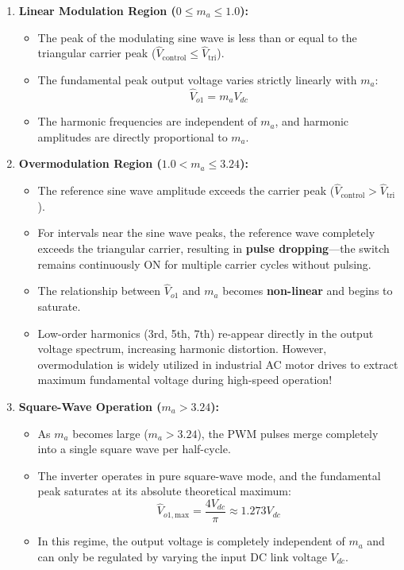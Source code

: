 \documentclass[11pt,a4paper]{article}
\begin{document}
\begin{enumerate}[leftmargin=*]
  \item \textbf{Linear Modulation Region ($0 \le m_a \le 1.0$):}
  \begin{itemize}
    \item The peak of the modulating sine wave is less than or equal to the triangular carrier peak ($\hat{V}_{\text{control}} \le \hat{V}_{\text{tri}}$).
    \item The fundamental peak output voltage varies strictly linearly with $m_a$:
    \begin{equation}
    \hat{V}_{o1} = m_a V_{dc}
    \end{equation}
    \item The harmonic frequencies are independent of $m_a$, and harmonic amplitudes are directly proportional to $m_a$.
  \end{itemize}

  \item \textbf{Overmodulation Region ($1.0 < m_a \le 3.24$):}
  \begin{itemize}
    \item The reference sine wave amplitude exceeds the carrier peak ($\hat{V}_{\text{control}} > \hat{V}_{\text{tri}}$).
    \item For intervals near the sine wave peaks, the reference wave completely exceeds the triangular carrier, resulting in \textbf{pulse dropping}—the switch remains continuously ON for multiple carrier cycles without pulsing.
    \item The relationship between $\hat{V}_{o1}$ and $m_a$ becomes \textbf{non-linear} and begins to saturate.
    \item Low-order harmonics (3rd, 5th, 7th) re-appear directly in the output voltage spectrum, increasing harmonic distortion. However, overmodulation is widely utilized in industrial AC motor drives to extract maximum fundamental voltage during high-speed operation!
  \end{itemize}

  \item \textbf{Square-Wave Operation ($m_a > 3.24$):}
  \begin{itemize}
    \item As $m_a$ becomes large ($m_a > 3.24$), the PWM pulses merge completely into a single square wave per half-cycle.
    \item The inverter operates in pure square-wave mode, and the fundamental peak saturates at its absolute theoretical maximum:
    \begin{equation}
    \hat{V}_{o1,\text{max}} = \frac{4V_{dc}}{\pi} \approx 1.273 V_{dc}
    \end{equation}
    \item In this regime, the output voltage is completely independent of $m_a$ and can only be regulated by varying the input DC link voltage $V_{dc}$.
  \end{itemize}
\end{enumerate}
\end{document}
